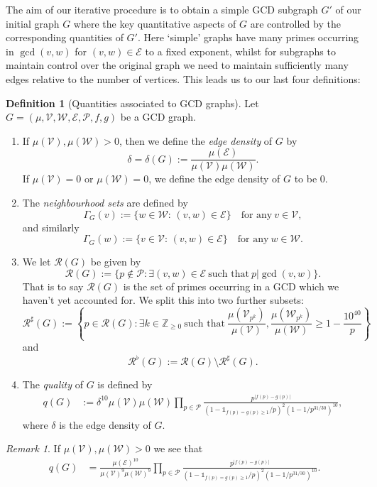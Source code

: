 \documentclass[12pt]{amsart}
\numberwithin{equation}{section}
\theoremstyle{definition}
\newtheorem{dfn}[lem]{Definition}
\theoremstyle{remark}
\newtheorem*{rem}{Remark}
\newcommand{\Z}{\mathbb{Z}}
\newcommand{\CE}{\mathcal{E}}
\newcommand{\CP}{\mathcal{P}}
\newcommand{\CR}{\mathcal{R}}
\newcommand{\CV}{\mathcal{V}}
\newcommand{\CW}{\mathcal{W}}
\newcommand{\als}[1]{\begin{align*} #1 \end{align*} }
\newcommand{\un}{\mathds{1}}
\renewcommand{\ge}{\geqslant}
\begin{document}
The aim of our iterative procedure is to obtain a simple GCD subgraph $G'$ of our initial graph $G$ where the key quantitative aspects of $G$ are controlled by the corresponding quantities of $G'$. Here `simple' graphs have many primes occurring in $\gcd(v,w)$ for $(v,w)\in\mathcal{E}$ to a fixed exponent, whilst for subgraphs to maintain control over the original graph we need to maintain sufficiently many edges relative to the number of vertices. This leads us to our last four definitions:
\begin{dfn}[Quantities associated to GCD graphs]
Let $G=(\mu,\CV,\CW,\CE,\CP,f,g)$ be a GCD graph.
\begin{enumerate}
	\item If $\mu(\CV),\mu(\CW)>0$, then we define the \emph{edge density} of $G$ by
	\[
	\delta=\delta(G):=\frac{\mu(\CE)}{\mu(\CV)\mu(\CW)}.
	\] 
	If $\mu(\CV)=0$ or $\mu(\CW)=0$, we define the edge density of $G$ to be $0$. 
	\item The \emph{neighbourhood sets} are defined by
	\[
	\Gamma_G(v):=\{w\in\CW:\,(v,w)\in\CE\}\quad\text{for any}\ v\in\CV,
	\]
and similarly 
\[
\Gamma_G(w):=\{v\in\CV:\,(v,w)\in\CE\}
\quad\text{for any}\ w\in \CW.
\]
	\item We let $\CR(G)$ be given by
	\[
	\CR(G):= \{p\notin\CP: \exists (v,w)\in\CE\ \text{such that}\ p|\gcd(v,w)\} .
	\]
	That is to say $\CR(G)$ is the set of primes occurring in a GCD which we haven't yet accounted for. We split this into two further subsets:
	\[
	\CR^\sharp(G):=\left\{p\in\CR(G): 
	\exists k\in\Z_{\ge0}\ \text{such that}\ \frac{\mu(\CV_{p^k})}{\mu(\CV)},\frac{\mu(\CW_{p^k})}{\mu(\CW)}\ge 1-\frac{10^{40}}{p}\right\}
	\]
	and
	\[
	\CR^\flat(G):=\CR(G)\setminus \CR^\sharp(G).
	\]
	\item The \emph{quality} of $G$ is defined by
	\als{
	q(G)&:= \delta^{10}\mu(\CV)\mu(\CW)
	\prod_{p\in\CP} \frac{p^{|f(p)-g(p)|}}{(1-\un_{f(p)=g(p)\ge1}/p)^2(1-1/p^{31/30})^{10}}, 
}
where $\delta$ is the edge density of $G$. 
\end{enumerate}	
\end{dfn}
\begin{rem}
If $\mu(\CV),\mu(\CW)>0$ we see that
\als{
		q(G)&= \frac{\mu(\CE)^{10}}{\mu(\CV)^{9}\mu(\CW)^{9}}
	\prod_{p\in\CP} \frac{p^{|f(p)-g(p)|}}{(1-\un_{f(p)=g(p)\ge1}/p)^2(1-1/p^{31/30})^{10}} .	
	}
\end{rem}
\end{document}
